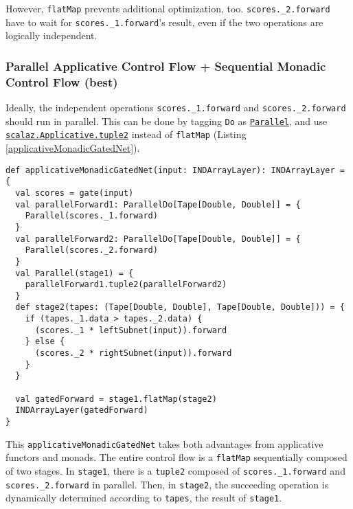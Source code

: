 However, \lstinline{flatMap} prevents additional optimization, too.
\lstinline{scores._2.forward} have to wait for \lstinline{scores._1.forward}'s result, even if the two operations are logically independent.

\subsubsection{Parallel Applicative Control Flow + Sequential Monadic Control Flow (best)\label{applicative}}

Ideally, the independent operations \lstinline{scores._1.forward} and \lstinline{scores._2.forward} should run in parallel. This can be done by tagging \lstinline{Do} as \href{https://javadoc.io/page/org.scalaz/scalaz_2.11/latest/scalaz/Tags$$Parallel.html}{\lstinline{Parallel}}, and use \href{https://javadoc.io/page/org.scalaz/scalaz_2.11/latest/scalaz/Applicative.htm\l#tuple2[A,B](fa:=>F[A],fb:=>F[B]):F[(A,B)]}{\lstinline{scalaz.Applicative.tuple2}} instead of \lstinline{flatMap} (Listing \ref{applicativeMonadicGatedNet}).

\begin{lstlisting}[caption={Applicative + monadic gated network}, label={applicativeMonadicGatedNet}]
def applicativeMonadicGatedNet(input: INDArrayLayer): INDArrayLayer = {
  val scores = gate(input)
  val parallelForward1: ParallelDo[Tape[Double, Double]] = {
    Parallel(scores._1.forward)
  }
  val parallelForward2: ParallelDo[Tape[Double, Double]] = {
    Parallel(scores._2.forward)
  }
  val Parallel(stage1) = {
  	parallelForward1.tuple2(parallelForward2)
  }
  def stage2(tapes: (Tape[Double, Double], Tape[Double, Double])) = {
    if (tapes._1.data > tapes._2.data) {
      (scores._1 * leftSubnet(input)).forward
    } else {
      (scores._2 * rightSubnet(input)).forward
    }
  }

  val gatedForward = stage1.flatMap(stage2)
  INDArrayLayer(gatedForward)
}
\end{lstlisting}

This \lstinline{applicativeMonadicGatedNet} takes both advantages from applicative functors and monads. The entire control flow is a \lstinline{flatMap} sequentially composed of two stages. In \lstinline{stage1}, there is a \lstinline{tuple2} composed of \lstinline{scores._1.forward} and \lstinline{scores._2.forward} in parallel. Then, in \lstinline{stage2}, the succeeding operation is dynamically determined according to \lstinline{tapes}, the result of \lstinline{stage1}.


